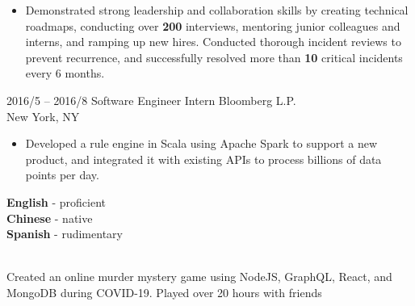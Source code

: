\documentclass[9pt]{developercv} %
\begin{document}
\begin{entrylist}
{\begin{itemize}[leftmargin=-0.0125in]
				\item Demonstrated strong leadership and collaboration skills by creating technical roadmaps, conducting over \textbf{200} interviews, mentoring junior colleagues and interns, and ramping up new hires. Conducted thorough incident reviews to prevent recurrence, and successfully resolved more than \textbf{10} critical incidents every 6 months.
				\end{itemize}
		}
	\entry
		{2016/5 -- 2016/8}
		{Software Engineer Intern}
		{Bloomberg L.P. \\\footnotesize{New York, NY}}
		{
			\begin{itemize}[leftmargin=-0.0125in]
		\item Developed a rule engine in Scala using Apache Spark to support a new product, and integrated it with existing APIs to process billions of data points per day.
	 	\end{itemize}
		}
\end{entrylist}


\begin{minipage}[t]{0.4\textwidth} %
	\vspace{-\baselineskip} %

	\begin{barchart}{4}
	\end{barchart}
\end{minipage}
\hfill
\begin{minipage}[t]{0.3\textwidth}
	\vspace{-\baselineskip} %
	
	
	\textbf{English} - proficient\\
	\textbf{Chinese} - native\\
	\textbf{Spanish} - rudimentary

	\\
	Created an online murder mystery game using NodeJS, GraphQL, React, and MongoDB during COVID-19. Played over 20 hours with friends
\end{minipage}
\hfill
\end{document}
